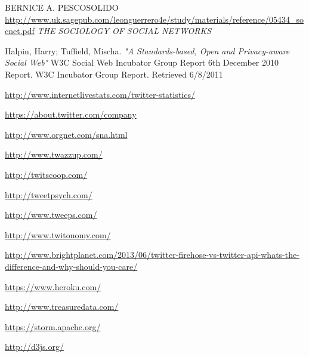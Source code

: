 \documentclass[a4paper,11pt]{report}
\begin{document}
\begin{thebibliography}{9}

	BERNICE A. PESCOSOLIDO
    \url{http://www.uk.sagepub.com/leonguerrero4e/study/materials/reference/05434_socnet.pdf}
    \emph{THE SOCIOLOGY OF SOCIAL NETWORKS}
    
  Halpin, Harry; Tuffield, Mischa.
  \emph{"A Standards-based, Open and Privacy-aware Social Web"}
  W3C Social Web Incubator Group Report 6th December 2010 Report. W3C Incubator Group Report. Retrieved 6/8/2011
    
	\url{http://www.internetlivestats.com/twitter-statistics/}
    
	\url{https://about.twitter.com/company}
    
	\url{http://www.orgnet.com/sna.html}
    
	\url{http://www.twazzup.com/}

	\url{http://twitscoop.com/}
    
	\url{http://tweetpsych.com/}
    
	\url{http://www.tweeps.com/}
    
	\url{http://www.twitonomy.com/}
    
	\url{http://www.brightplanet.com/2013/06/twitter-firehose-vs-twitter-api-whats-the-difference-and-why-should-you-care/}

	\url{https://www.heroku.com/}
    
	\url{http://www.treasuredata.com/}

	\url{https://storm.apache.org/}
    
	\url{http://d3js.org/}
    

\end{thebibliography}
\end{document}
